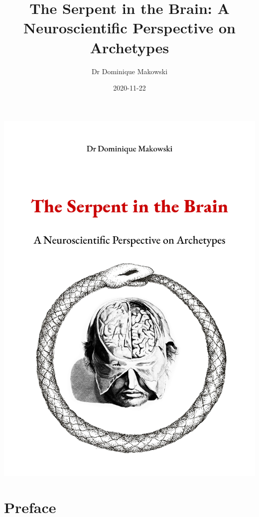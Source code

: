 \documentclass[
]{book}
\title{The Serpent in the Brain: A Neuroscientific Perspective on Archetypes}
\author{Dr Dominique Makowski}
\date{2020-11-22}
\let\oldmaketitle\maketitle
\begin{document}
\maketitle

\thispagestyle{empty}
\begin{center}
\includegraphics[width=\textwidth]{img/cover.png}
\end{center}

\let\maketitle\oldmaketitle
\maketitle

{
\hypersetup{linkcolor=}
\setcounter{tocdepth}{3}
\tableofcontents
}
\listoftables
\listoffigures
\hypertarget{preface}{%
\chapter*{Preface}\label{preface}}
\end{document}
